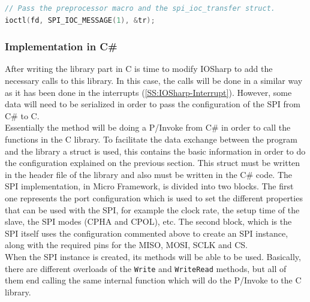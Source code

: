 \begin{lstlisting}[language=C, caption={IOSharp.c - SPI transfer}]
// Pass the preprocessor macro and the spi_ioc_transfer struct.
ioctl(fd, SPI_IOC_MESSAGE(1), &tr);
\end{lstlisting}

\subsubsection{Implementation in C\#}\label{SSS:IOSharp-SPI-Implementation-CSharp}
After writing the library part in C is time to modify IOSharp to add the necessary calls to this library. In this case, the calls will be done in a similar way as it has been done in the interrupts (\ref{SS:IOSharp-Interrupt}). However, some data will need to be serialized in order to pass the configuration of the SPI from C\# to C.
\\
Essentially the method will be doing a P/Invoke from C\# in order to call the functions in the C library. To facilitate the data exchange between the program and the library a struct is used, this contains the basic information in order to do the configuration explained on the previous section. This struct must be written in the header file of the library and also must be written in the C\# code. The SPI implementation, in Micro Framework, is divided into two blocks. The first one represents the port configuration which is used to set the different properties that can be used with the SPI, for example the clock rate, the setup time of the slave, the SPI modes (CPHA and CPOL), etc. The second block, which is the SPI itself uses the configuration commented above to create an SPI instance, along with the required pins for the \gls{MISO}, \gls{MOSI}, \gls{SCLK} and \gls{CS}.
\\
When the SPI instance is created, its methods will be able to be used. Basically, there are different overloads of the \verb!Write! and \verb!WriteRead! methods, but all of them end calling the same internal function which will do the P/Invoke to the C library.


